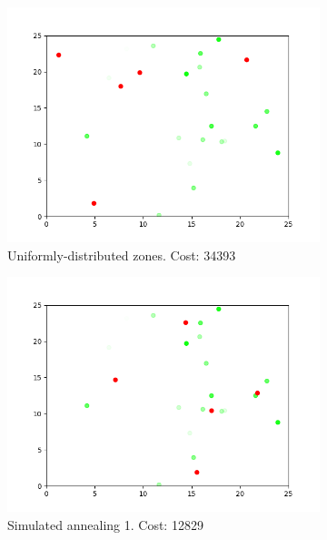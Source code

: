 \documentclass[11pt]{article}
\begin{document}
\begin{figure}[h!]
  \centering
  \begin{subfigure}[b]{0.4\linewidth}
    \includegraphics[width=\linewidth]{simulated_annealing_0.png}
    \caption*{Uniformly-distributed zones. Cost: 34393}
  \end{subfigure}
  \begin{subfigure}[b]{0.4\linewidth}
    \includegraphics[width=\linewidth]{simulated_annealing_1.png}
    \caption*{Simulated annealing 1. Cost: 12829}
  \end{subfigure}
  \begin{subfigure}[b]{0.4\linewidth}

\end{subfigure}
\end{figure}
\end{document}
